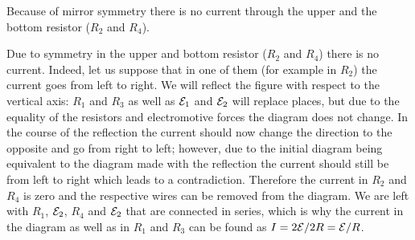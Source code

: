 {\ifEngHint
Because of mirror symmetry there is no current through the upper and the bottom resistor ($R_2$ and $R_4$).
\fi


\ifEngSolution
Due to symmetry in the upper and bottom resistor ($R_2$ and $R_4$) there is no current. Indeed, let us suppose that in one of them (for example in $R_2$) the current goes from left to right. We will reflect the figure with respect to the vertical axis: $R_1$ and $R_3$ as well as ${\cal E}_1$ and ${\cal E}_2$ will replace places, but due to the equality of the resistors and electromotive forces the diagram does not change. In the course of the reflection the current should now change the direction to the opposite and go from right to left; however, due to the initial diagram being equivalent to the diagram made with the reflection the current should still be from left to right which leads to a contradiction. Therefore the current in $R_2$ and $R_4$ is zero and the respective wires can be removed from the diagram. We are left with $R_1$, ${\cal E}_2$, $R_4$ and ${\cal E}_2$ that are connected in series, which is why the current in the diagram as well as in $R_1$ and $R_3$ can be found as $I=2{\cal E}/2R = {\cal E}/R$.
\fi
}